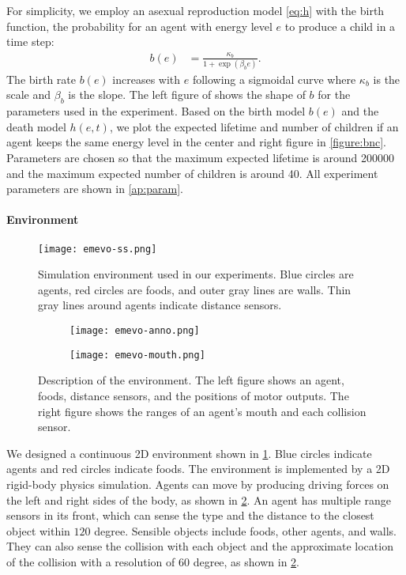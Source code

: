 For simplicity, we employ an asexual reproduction model \cref{eq:h} with the birth function, the probability for an agent with energy level $e$ to produce a child in a time step:
\begin{align}
 b(e) &= \frac{\kappa_{b}}{1 + \exp(\beta_{b}e)}.
 \label{eq:b}
\end{align}
The birth rate $b(e)$ increases with $e$ following a sigmoidal curve where $\kappa_{b}$ is the scale and $\beta_{b}$ is the slope.
The left figure of  shows the shape of $b$ for the parameters used in the experiment.
Based on the birth model $b(e)$ and the death model $h(e,t)$, we plot the expected lifetime and number of children if an agent keeps the same energy level in the center and right figure in \cref{figure:bnc}. Parameters are chosen so that the maximum expected lifetime is around \num{200000} and the maximum expected number of children is around 40. All experiment parameters are shown in \cref{ap:param}.

\paragraph{Environment}

\begin{figure}[t]
  \centering
  \texttt{[image: emevo-ss.png]}
  \caption{
    Simulation environment used in our experiments.
    Blue circles are agents, red circles are foods, and outer gray lines are walls.
    Thin gray lines around agents indicate distance sensors.
  }\label{figure:env}
\end{figure}

\begin{figure}[t]
  \begin{subfigure}[t]{4cm}
    \centering
    \texttt{[image: emevo-anno.png]}
  \end{subfigure}
  \begin{subfigure}[t]{4cm}
    \centering
    \texttt{[image: emevo-mouth.png]}
  \end{subfigure}
  \caption{
    Description of the environment.
    The left figure shows an agent, foods, distance sensors, and the positions of motor outputs.
    The right figure shows the ranges of an agent's mouth and each collision sensor.
  }\label{figure:env-discr}
\end{figure}

We designed a continuous 2D environment shown in \cref{figure:env}. Blue circles indicate agents and red circles indicate foods. The environment is implemented by a 2D rigid-body physics simulation. Agents can move by producing driving forces on the left and right sides of the body, as shown in \cref{figure:env-discr}.
An agent has multiple range sensors in its front, which can sense the type and the distance to the closest object within $120$ degree. Sensible objects include foods, other agents, and walls. They can also sense the collision with each object and the approximate location of the collision with a resolution of $60$ degree, as shown in \cref{figure:env-discr}.

